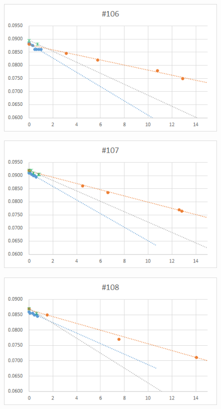   \begin{figure}[htbp]
    \centering
       \includegraphics[width=120mm]{vol_106.png}
  \end{figure}
  \begin{figure}[htbp]
    \centering
       \includegraphics[width=120mm]{vol_107.png}
  \end{figure}
  \begin{figure}[htbp]
    \centering
       \includegraphics[width=120mm]{vol_108.png}
  \end{figure}
